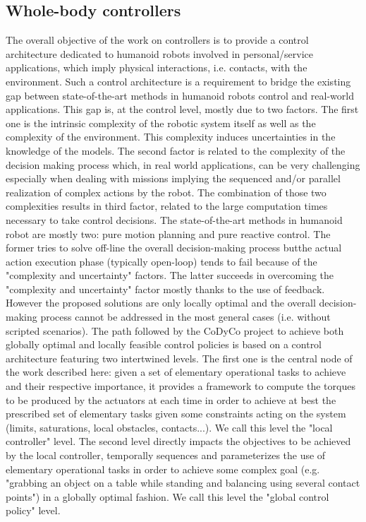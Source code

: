\documentclass[final,5p,twocolumn]{elsarticle}
\begin{document}
\subsection{Whole-body controllers}

The overall objective of the work on controllers is to provide a control architecture dedicated 
to humanoid robots involved in personal/service applications, which imply physical interactions,
 i.e. contacts, with the environment. Such a control architecture is a requirement to bridge 
 the existing gap between state-of-the-art methods in humanoid robots control and real-world
applications. This gap is, at the control level, mostly due to two factors. The first one is the intrinsic 
complexity of the robotic system itself as well as the complexity of the environment. This complexity induces uncertainties in the
knowledge of the models. The second factor is related to the complexity of the decision making process which, in real world applications, can be
very challenging especially when dealing with missions implying the sequenced and/or parallel realization of complex actions by the robot. The
 combination of those two complexities results in third factor, related to the large computation  times necessary to take control decisions.
The state-of-the-art methods in humanoid robot are mostly two: pure motion planning and pure reactive control.
 The former tries to solve off-line the overall decision-making process butthe actual action execution phase (typically open-loop) tends to fail because of 
the "complexity and uncertainty" factors. The latter succeeds in overcoming the "complexity and uncertainty" factor mostly
thanks to the use of feedback. However the proposed solutions are only locally optimal and the overall
decision-making process cannot be addressed in the most general cases (i.e. without scripted scenarios).
The path followed by the CoDyCo project to achieve both globally optimal and locally feasible control
policies is based on a control architecture featuring two intertwined levels. The first one is the central node of
the work described here: given a set of elementary operational tasks to achieve and their respective importance, it
provides a framework to compute the torques to be produced by the actuators at each time in order to achieve
at best the prescribed set of elementary tasks given some constraints acting on the system (limits, saturations,
local obstacles, contacts...). We call this level the "local controller" level. The second level directly impacts the objectives to be achieved by the local controller, temporally
sequences and parameterizes the use of elementary operational tasks in order to achieve some complex goal
(e.g. "grabbing an object on a table while standing and balancing using several contact points") in a globally
optimal fashion. We call this level the "global control policy" level. 
\end{document}
